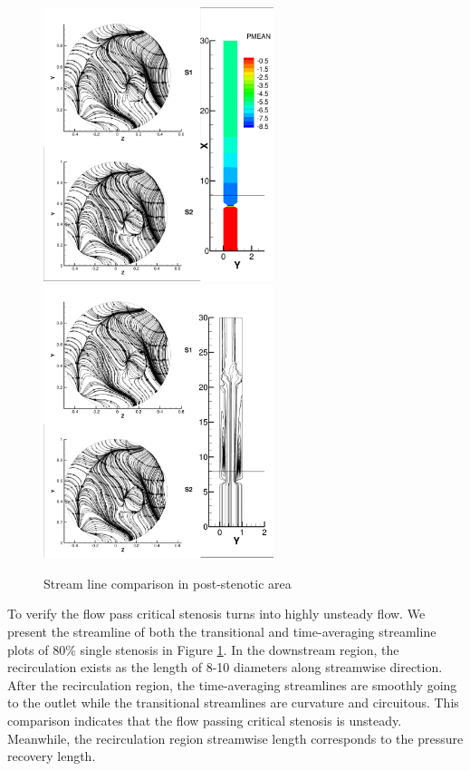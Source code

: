\begin{figure}[H]
	\centering
	\includegraphics[trim= 1mm 1mm 1mm 1mm,clip,width=0.60\textwidth]{./pics/trans.png}
	\includegraphics[trim= 1mm 2mm 1mm 1mm,clip,width=0.60\textwidth]{./pics/trans2.png}
	\caption{Stream line comparison in post-stenotic area}
	\label{fig:post streamline comparison}
\end{figure}

To verify the flow pass critical stenosis turns into highly unsteady flow. We present the streamline of both the transitional and time-averaging streamline plots of 80\% single stenosis in Figure \ref{fig:post streamline comparison}.
In the downstream region, the recirculation exists as the length of 8-10 diameters along streamwise direction.
After the recirculation region, the time-averaging streamlines are smoothly going to the outlet while the transitional streamlines are curvature and circuitous.
This comparison indicates that the flow passing critical stenosis is unsteady. 
Meanwhile, the recirculation region streamwise length corresponds to the pressure recovery length.\\

